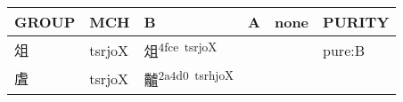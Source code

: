 \documentclass[14pt,a4paper]{scrartcl}
\begin{document}
\begin{longtable}[c]{@{}llllll@{}}
\toprule
\begin{minipage}[b]{0.14\columnwidth}\raggedright\strut
GROUP
\strut\end{minipage} &
\begin{minipage}[b]{0.14\columnwidth}\raggedright\strut
MCH
\strut\end{minipage} &
\begin{minipage}[b]{0.14\columnwidth}\raggedright\strut
B
\strut\end{minipage} &
\begin{minipage}[b]{0.14\columnwidth}\raggedright\strut
A
\strut\end{minipage} &
\begin{minipage}[b]{0.14\columnwidth}\raggedright\strut
none
\strut\end{minipage} &
\begin{minipage}[b]{0.14\columnwidth}\raggedright\strut
PURITY
\strut\end{minipage}\tabularnewline
\midrule
\endhead
\begin{minipage}[t]{0.14\columnwidth}\raggedright\strut
俎
\strut\end{minipage} &
\begin{minipage}[t]{0.14\columnwidth}\raggedright\strut
tsrjoX
\strut\end{minipage} &
\begin{minipage}[t]{0.14\columnwidth}\raggedright\strut
俎\textsuperscript{4fce~tsrjoX}
\strut\end{minipage} &
\begin{minipage}[t]{0.14\columnwidth}\raggedright\strut
\strut\end{minipage} &
\begin{minipage}[t]{0.14\columnwidth}\raggedright\strut
\strut\end{minipage} &
\begin{minipage}[t]{0.14\columnwidth}\raggedright\strut
pure:B
\strut\end{minipage}\tabularnewline
\begin{minipage}[t]{0.14\columnwidth}\raggedright\strut
虘
\strut\end{minipage} &
\begin{minipage}[t]{0.14\columnwidth}\raggedright\strut
tsrjoX
\strut\end{minipage} &
\begin{minipage}[t]{0.14\columnwidth}\raggedright\strut
𪓐\textsuperscript{2a4d0~tsrhjoX}
\strut\end{minipage} &

\end{longtable}
\end{document}
